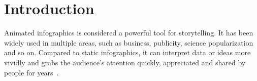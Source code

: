 \section{Introduction}
\label{sec:intro}

Animated infographics is considered a powerful tool for storytelling. 
It has been widely used in multiple areas, such as business, publicity, science popularization and so on. 
Compared to static infographics, it can interpret data or ideas more vividly and grabs the audience's attention quickly, appreciated and shared by people for years~\cite{blazer2019animated, brehmer2016timelines}. %


